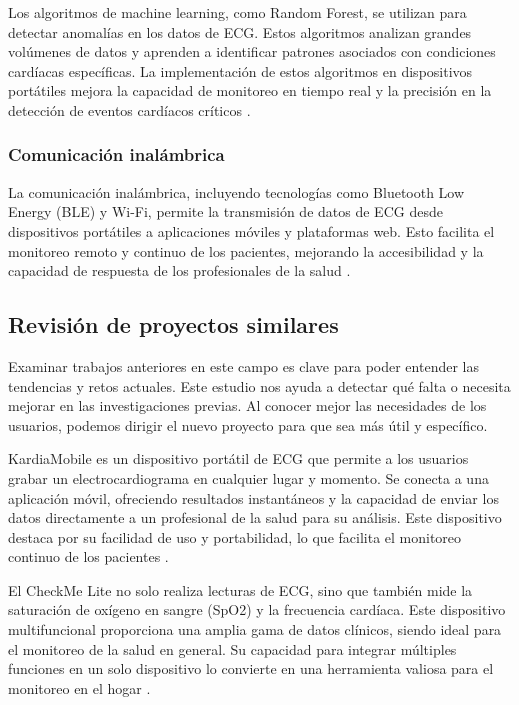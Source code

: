 Los algoritmos de machine learning, como Random Forest, se utilizan para detectar anomalías en los datos de ECG. Estos algoritmos analizan grandes volúmenes de datos y aprenden a identificar patrones asociados con condiciones cardíacas específicas. La implementación de estos algoritmos en dispositivos portátiles mejora la capacidad de monitoreo en tiempo real y la precisión en la detección de eventos cardíacos críticos \cite{breiman2001random}.

\subsubsection{Comunicación inalámbrica}

La comunicación inalámbrica, incluyendo tecnologías como Bluetooth Low Energy (BLE) y Wi-Fi, permite la transmisión de datos de ECG desde dispositivos portátiles a aplicaciones móviles y plataformas web. Esto facilita el monitoreo remoto y continuo de los pacientes, mejorando la accesibilidad y la capacidad de respuesta de los profesionales de la salud \cite{TechZero2024}.

\subsection{Revisión de proyectos similares}


Examinar trabajos anteriores en este campo es clave para poder entender las tendencias y retos actuales. Este estudio nos ayuda a detectar qué falta o necesita mejorar en las investigaciones previas. Al conocer mejor las necesidades de los usuarios, podemos dirigir el nuevo proyecto para que sea más útil y específico.

KardiaMobile es un dispositivo portátil de ECG que permite a los usuarios grabar un electrocardiograma en cualquier lugar y momento. Se conecta a una aplicación móvil, ofreciendo resultados instantáneos y la capacidad de enviar los datos directamente a un profesional de la salud para su análisis. Este dispositivo destaca por su facilidad de uso y portabilidad, lo que facilita el monitoreo continuo de los pacientes \cite{kardiamobile}.

El CheckMe Lite no solo realiza lecturas de ECG, sino que también mide la saturación de oxígeno en sangre (SpO2) y la frecuencia cardíaca. Este dispositivo multifuncional proporciona una amplia gama de datos clínicos, siendo ideal para el monitoreo de la salud en general. Su capacidad para integrar múltiples funciones en un solo dispositivo lo convierte en una herramienta valiosa para el monitoreo en el hogar \cite{checkme}.

